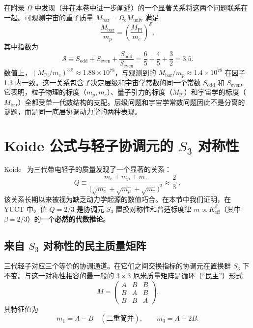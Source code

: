 \documentclass[11pt,a4paper]{article}
\theoremstyle{remark}
\begin{document}
	在附录 $\Omega$ 中发现（并在本卷中进一步阐述）的一个显著关系将这两个问题联系在一起。可观测宇宙的重子质量 \(M_{\mathrm{bar}} = \Omega_b M_{\mathrm{univ}}\) 满足
	\begin{equation}
		\frac{M_{\mathrm{bar}}}{m_p} = \left( \frac{M_{\mathrm{Pl}}}{m_e} \right)^{\mathcal{S}},
		\label{eq:baryon-hierarchy}
	\end{equation}
	其中指数为
	\begin{equation}
		\mathcal{S} \equiv S_{\mathrm{odd}} + S_{\mathrm{even}} + \frac{S_{\mathrm{odd}}}{S_{\mathrm{even}}} = \frac{6}{5} + \frac{4}{5} + \frac{3}{2} = 3.5.
	\end{equation}
	数值上，\((M_{\mathrm{Pl}}/m_e)^{3.5} \approx 1.88 \times 10^{78}\)，与观测到的 \(M_{\mathrm{bar}}/m_p \approx 1.4 \times 10^{78}\) 在因子 1.3 内一致。这一关系包含了决定层级和宇宙学常数的同一个常数 \(S_{\mathrm{odd}}\) 和 \(S_{\mathrm{even}}\)。它表明，粒子物理的标度（\(m_p, m_e\)）、量子引力的标度（\(M_{\mathrm{Pl}}\)）和宇宙学的标度（\(M_{\mathrm{bar}}\)）全都受单一代数结构的支配。层级问题和宇宙学常数问题因此不是分离的谜题，而是同一底层协调动力学的两种表现。
	
	\section{Koide 公式与轻子协调元的 \(S_3\) 对称性}
	\label{sec:koide}
	
	Koide~\cite{Koide1983} 为三代带电轻子的质量发现了一个显著的关系：
	\begin{equation}
		Q \equiv \frac{m_e + m_\mu + m_\tau}{\bigl(\sqrt{m_e} + \sqrt{m_\mu} + \sqrt{m_\tau}\bigr)^2}
		\approx \frac{2}{3}\;,
	\end{equation}
	该关系长期以来被视为缺乏动力学起源的数值巧合。在本节中我们证明，在 YUCT 中，值 \(Q=2/3\) 是协调元 \(S_3\) 置换对称性和普适标度律 \(m \propto K_{\mathrm{eff}}^{\beta}\)（其中 \(\beta=2/3\)）的一个\textbf{必然的代数推论}。
	
	\subsection{来自 \(S_3\) 对称性的民主质量矩阵}
	
	三代轻子对应三个等价的协调通道。在它们之间交换指标的协调元在置换群 \(S_3\) 下不变。与这一对称性相容的最一般的 \(3\times3\) 厄米质量矩阵是循环（“民主”）形式
	\begin{equation}
		M = \begin{pmatrix}
			A & B & B \\
			B & A & B \\
			B & B & A
		\end{pmatrix}.
		\label{eq:democratic}
	\end{equation}
	其特征值为
	\begin{equation}
		m_1 = A - B \quad (\text{二重简并}), \qquad
		m_3 = A + 2B .
		\label{eq:dem-eigen}
	\end{equation}
	
\end{document}
